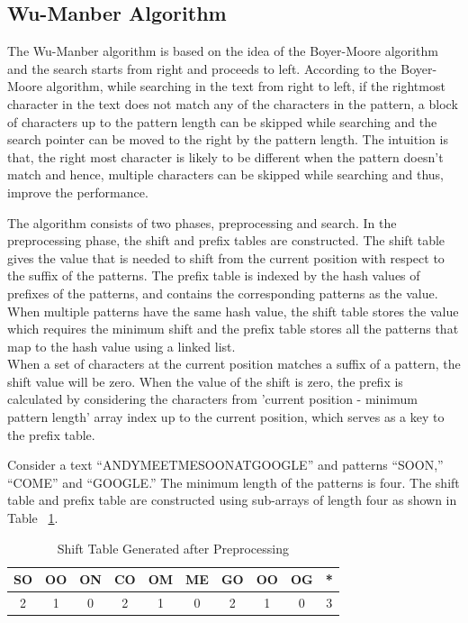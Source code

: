 \subsection{Wu-Manber Algorithm}
The Wu-Manber algorithm \cite{bib16} is based on the idea of the Boyer-Moore algorithm \cite{bib17} and the search starts from right and proceeds to left. According to the Boyer-Moore algorithm, while searching in the text from right to left, if the rightmost character in the text does not match any of the characters in the pattern, a block of characters up to the pattern length can be skipped while searching and the search pointer can be moved to the right by the pattern length. The intuition is that, the right most character is likely to be different when the pattern doesn't match and hence, multiple characters can be skipped while searching and thus, improve the performance.

The algorithm consists of two phases, preprocessing and search. In the preprocessing phase, the shift and prefix tables are constructed. The shift table gives the value that is needed to shift from the current position with respect to the suffix of the patterns. The prefix table is indexed by the hash values of prefixes of the patterns, and contains the corresponding patterns as the value. When multiple patterns have the same hash value, the shift table stores the value which requires the minimum shift and the prefix table stores all the patterns that map to the hash value using a linked list.\\ When a set of characters at the current position matches a suffix of a pattern, the shift value will be zero. When the value of the shift is zero, the prefix is calculated by considering the characters from 'current position - minimum pattern length' array index up to the current position, which serves as a key to the prefix table. 

Consider a text “ANDYMEETMESOONATGOOGLE” and patterns “SOON,” “COME” and “GOOGLE.” The minimum length of the patterns is four. The shift table and prefix table are constructed using sub-arrays of length four as shown in Table ~\ref{tab:shiftwuman}.

\begin {table}[H]
\centering
\caption {Shift Table Generated after Preprocessing} \label{tab:shiftwuman}
\begin{tabular}{|c|c|c|c|c|c|c|c|c|c|}
\midrule
SO &    OO &    ON &    CO &    OM &    ME &    GO &    OO &    OG   &    * \\
\midrule
2 & 1 & 0 & 2 & 1 & 0 & 2 & 1 & 0  & 3\\
\midrule
\end{tabular}
\end{table}
\squeezeup

